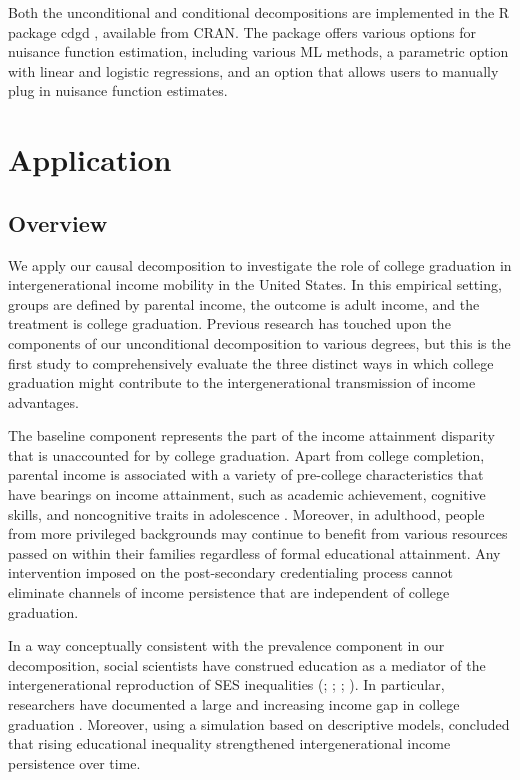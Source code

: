 \documentclass[12pt,a4paper]{article}
\begin{document}
Both the unconditional and conditional decompositions are implemented in the R \citep{R_core_team_2023} package cdgd \citep{yu_2023}, available from CRAN. The package offers various options for nuisance function estimation, including various ML methods, a parametric option with linear and logistic regressions, and an option that allows users to manually plug in nuisance function estimates.


\section{Application}
\subsection{Overview}
We apply our causal decomposition to investigate the role of college graduation in intergenerational income mobility in the United States. In this empirical setting, groups are defined by parental income, the outcome  is adult income, and the treatment is college graduation. 
Previous research has touched upon the components of our unconditional decomposition to various degrees, but this is the first study to comprehensively evaluate the three distinct ways in which college graduation might contribute to the intergenerational transmission of income advantages. 

The baseline component represents the part of the income attainment disparity that is unaccounted for by college graduation. Apart from college completion, parental income is associated with a variety of pre-college characteristics that have bearings on income attainment, such as academic achievement, cognitive skills, and noncognitive traits in adolescence \citep{reardon_widening_2011, heckman_effects_2006, farkas_cognitive_2003}. Moreover, in adulthood, people from more privileged backgrounds may continue to benefit from various resources passed on within their families regardless of formal educational attainment. Any intervention imposed on the post-secondary credentialing process cannot eliminate channels of income persistence that are independent of college graduation. 

In a way conceptually consistent with the prevalence component in our decomposition, social scientists have construed education as a mediator of the intergenerational reproduction of SES inequalities (\citealp[chapter 4 \& 5]{blau_american_1978}; \citealp[p.255-9]{featherman_opportunity_1978}; \citealp{ishida_class_1995}; \citealp{breen_educational_2010}). In particular, researchers have documented a large and increasing income gap in college graduation \citep{ziol-guest_parent_2016, bailey_gains_2011}. Moreover, using a simulation based on descriptive models, \citet{bloome_educational_2018} concluded that rising educational inequality strengthened intergenerational income persistence over time. 
\end{document}
